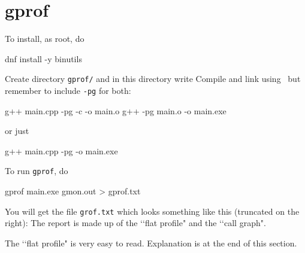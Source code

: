 \section{gprof}

To install, as root, do
\begin{console}[fontsize=\footnotesize]
dnf install -y binutils
\end{console}

Create directory \verb!gprof/! and in this directory write
Compile and link using \gpp\ but remember to include \verb!-pg! for both:
\begin{console}[fontsize=\footnotesize]
g++ main.cpp -pg -c -o main.o
g++ -pg main.o -o main.exe
\end{console}
or just
\begin{console}[fontsize=\footnotesize]
g++ main.cpp -pg -o main.exe
\end{console}

To run \verb!gprof!, do
\begin{console}[fontsize=\footnotesize]
gprof main.exe gmon.out > gprof.txt
\end{console}
You will get the file \verb!grof.txt! which looks something like
this (truncated on the right):
The report is made up of the \lq\lq flat profile" and the \lq\lq call graph".

The \lq\lq flat profile" is very easy to read.
Explanation is at the end of this section.

